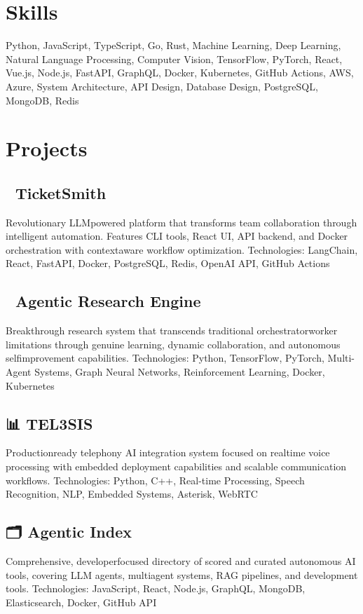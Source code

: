 \documentclass{article}
\begin{document}
\section*{Skills}
Python, JavaScript, TypeScript, Go, Rust, Machine Learning, Deep Learning, Natural Language Processing, Computer Vision, TensorFlow, PyTorch, React, Vue.js, Node.js, FastAPI, GraphQL, Docker, Kubernetes, GitHub Actions, AWS, Azure, System Architecture, API Design, Database Design, PostgreSQL, MongoDB, Redis

\section*{Projects}
\subsection*{🎯 TicketSmith}
Revolutionary LLMpowered platform that transforms team collaboration through intelligent automation. Features CLI tools, React UI, API backend, and Docker orchestration with contextaware workflow optimization.
Technologies: LangChain, React, FastAPI, Docker, PostgreSQL, Redis, OpenAI API, GitHub Actions

\subsection*{🧠 Agentic Research Engine}
Breakthrough research system that transcends traditional orchestratorworker limitations through genuine learning, dynamic collaboration, and autonomous selfimprovement capabilities.
Technologies: Python, TensorFlow, PyTorch, Multi-Agent Systems, Graph Neural Networks, Reinforcement Learning, Docker, Kubernetes

\subsection*{📊 TEL3SIS}
Productionready telephony AI integration system focused on realtime voice processing with embedded deployment capabilities and scalable communication workflows.
Technologies: Python, C++, Real-time Processing, Speech Recognition, NLP, Embedded Systems, Asterisk, WebRTC

\subsection*{🗂️ Agentic Index}
Comprehensive, developerfocused directory of scored and curated autonomous AI tools, covering LLM agents, multiagent systems, RAG pipelines, and development tools.
Technologies: JavaScript, React, Node.js, GraphQL, MongoDB, Elasticsearch, Docker, GitHub API
\end{document}

